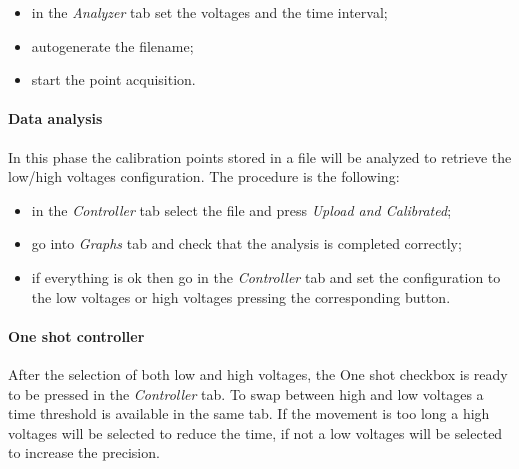 \begin{itemize}
      \itemsep1pt\parskip0pt
      \item
            in the \emph{Analyzer} tab set the voltages and the time interval;
      \item
            autogenerate the filename;
      \item
            start the point acquisition.
\end{itemize}

\paragraph{Data analysis}

In this phase the calibration points stored in a
file will be analyzed to retrieve the low/high voltages configuration. The procedure is the following:

\begin{itemize}
      \itemsep1pt\parskip0pt
      \item
            in the \emph{Controller} tab select the file and press \emph{Upload
                  and Calibrated};
      \item
            go into \emph{Graphs} tab and check that the analysis is completed
            correctly;
      \item
            if everything is ok then go in the \emph{Controller} tab and set the
            configuration to the low voltages or high voltages pressing the
            corresponding button.
\end{itemize}



\paragraph{One shot controller}

After the selection of both low and high voltages, the One shot checkbox is ready to be pressed in the \emph{Controller} tab. To
swap between high and low voltages a time threshold is available in the same tab. If the movement is too long a high voltages will be selected to reduce the time, if not a low voltages will be selected to increase the precision.


